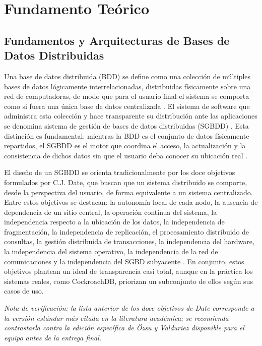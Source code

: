 \documentclass[12pt, a4paper]{article}
\begin{document}
\section{Fundamento Teórico}
\label{fundamento-teorico}

\subsection{Fundamentos y Arquitecturas de Bases de Datos Distribuidas}

Una base de datos distribuida (BDD) se define como una colección de múltiples bases de datos lógicamente interrelacionadas, distribuidas físicamente sobre una red de computadoras, de modo que para el usuario final el sistema se comporta como si fuera una única base de datos centralizada \cite{ozsu2020principles}. El sistema de software que administra esta colección y hace transparente su distribución ante las aplicaciones se denomina sistema de gestión de bases de datos distribuidas (SGBDD) \cite{ozsu2020principles}. Esta distinción es fundamental: mientras la BDD es el conjunto de datos físicamente repartidos, el SGBDD es el motor que coordina el acceso, la actualización y la consistencia de dichos datos sin que el usuario deba conocer su ubicación real \cite{kleppmann2017designing}.

El diseño de un SGBDD se orienta tradicionalmente por los doce objetivos formulados por C.J. Date, que buscan que un sistema distribuido se comporte, desde la perspectiva del usuario, de forma equivalente a un sistema centralizado. Entre estos objetivos se destacan: la autonomía local de cada nodo, la ausencia de dependencia de un sitio central, la operación continua del sistema, la independencia respecto a la ubicación de los datos, la independencia de fragmentación, la independencia de replicación, el procesamiento distribuido de consultas, la gestión distribuida de transacciones, la independencia del hardware, la independencia del sistema operativo, la independencia de la red de comunicaciones y la independencia del SGBD subyacente \cite{ozsu2020principles}. En conjunto, estos objetivos plantean un ideal de transparencia casi total, aunque en la práctica los sistemas reales, como CockroachDB, priorizan un subconjunto de ellos según sus casos de uso.

\textit{Nota de verificación: la lista anterior de los doce objetivos de Date corresponde a la versión estándar más citada en la literatura académica; se recomienda contrastarla contra la edición específica de Özsu y Valduriez disponible para el equipo antes de la entrega final.}
\end{document}
